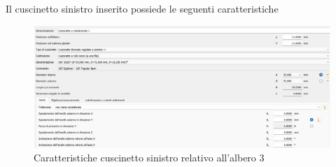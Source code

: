 Il cuscinetto sinistro inserito possiede le seguenti caratteristiche
\begin{figure}[h]
    \centering
    \includegraphics[scale=0.45]{Immagini/CuscinettoSinistraAlbero3.png}
    \caption{Caratteristiche cuscinetto sinistro relativo all'albero 3}
    \label{fig:CuscinettoSinsitraAlbero3}
\end{figure}

